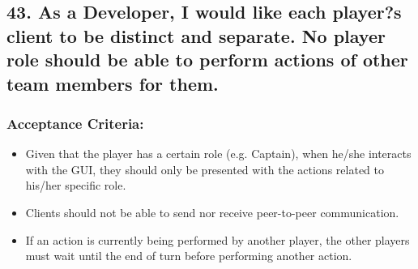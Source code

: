 \subsection*{43. As a Developer, I would like each player?s client to be distinct and separate. No player role should be able to perform actions of other team members for them.
}


\subsubsection*{Acceptance Criteria:}

\begin{itemize}
\item Given that the player has a certain role (e.g. Captain), when he/she interacts with the GUI, they should only be presented with the actions related to his/her specific role.
\item Clients should not be able to send nor receive peer-to-peer communication.
\item If an action is currently being performed by another player, the other players must wait until the end of turn before performing another action.
\end{itemize}
